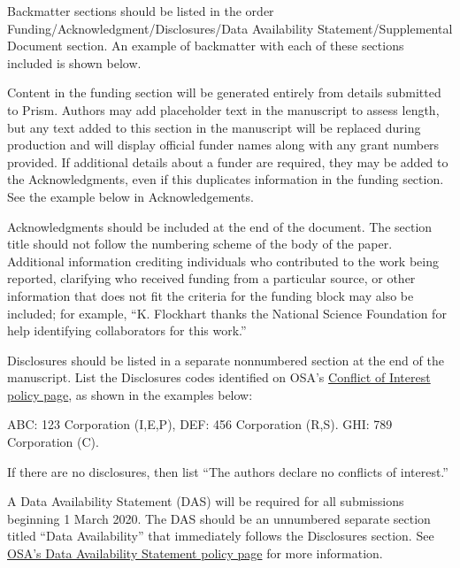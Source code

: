 \documentclass{osa-article}
\begin{document}
Backmatter sections should be listed in the order Funding/Acknowledgment/Disclosures/Data Availability Statement/Supplemental Document section. An example of backmatter with each of these sections included is shown below.

\begin{backmatter}
Content in the funding section will be generated entirely from details submitted to Prism. Authors may add placeholder text in the manuscript to assess length, but any text added to this section in the manuscript will be replaced during production and will display official funder names along with any grant numbers provided. If additional details about a funder are required, they may be added to the Acknowledgments, even if this duplicates information in the funding section. See the example below in Acknowledgements.

Acknowledgments should be included at the end of the document. The section title should not follow the numbering scheme of the body of the paper. Additional information crediting individuals who contributed to the work being reported, clarifying who received funding from a particular source, or other information that does not fit the criteria for the funding block may also be included; for example, ``K. Flockhart thanks the National Science Foundation for help identifying collaborators for this work.'' 

Disclosures should be listed in a separate nonnumbered section at the end of the manuscript. List the Disclosures codes identified on OSA's \href{http://www.osapublishing.org/submit/review/conflicts-interest-policy.cfm}{Conflict of Interest policy page}, as shown in the examples below:

\medskip

\noindent ABC: 123 Corporation (I,E,P), DEF: 456 Corporation (R,S). GHI: 789 Corporation (C).

\medskip

\noindent If there are no disclosures, then list ``The authors declare no conflicts of interest.''


A Data Availability Statement (DAS) will be required for all submissions beginning 1 March 2020. The DAS should be an unnumbered separate section titled ``Data Availability'' that
immediately follows the Disclosures section. See \href{https://www.osapublishing.org/submit/review/data-availability-policy.cfm}{OSA's Data Availability Statement policy page} for more information.


\end{backmatter}
\end{document}
